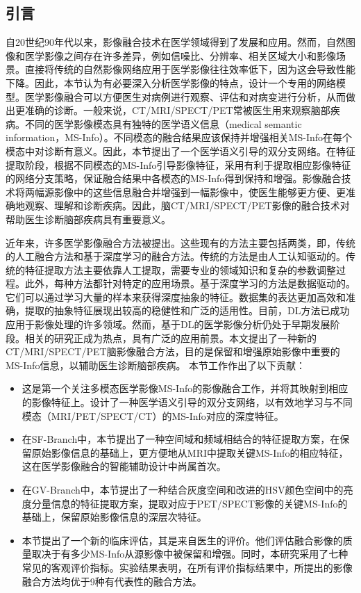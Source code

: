 \subsection{引言}
自20世纪90年代以来，影像融合技术在医学领域得到了发展和应用。然而，自然图像和医学影像之间存在许多差异，例如信噪比、分辨率、相关区域大小和影像场景\cite{wei2022beyond,shen2021Interpretable,guo2018single,xia2019global}。直接将传统的自然影像网络应用于医学影像往往效率低下，因为这会导致性能下降。因此，本节认为有必要深入分析医学影像的特点，设计一个专用的网络模型。医学影像融合可以方便医生对病例进行观察、评估和对病变进行分析，从而做出更准确的诊断。一般来说，CT/MRI/SPECT/PET常被医生用来观察脑部疾病。不同的医学影像模态具有独特的医学语义信息（medical semantic information，MS-Info）。不同模态的融合结果应该保持并增强相关MS-Info在每个模态中对诊断有意义。因此，本节提出了一个医学语义引导的双分支网络。在特征提取阶段，根据不同模态的MS-Info引导影像特征，采用有利于提取相应影像特征的网络分支策略，保证融合结果中各模态的MS-Info得到保持和增强。影像融合技术将两幅源影像中的这些信息融合并增强到一幅影像中，使医生能够更方便、更准确地观察、理解和诊断疾病。因此，脑CT/MRI/SPECT/PET影像的融合技术对帮助医生诊断脑部疾病具有重要意义。

近年来，许多医学影像融合方法被提出。这些现有的方法主要包括两类，即，传统的人工融合方法\cite{2017Boundary,2018Multi,2018Infrared,2020An,diwakar2021multi,2020Latent}和基于深度学习的融合方法\cite{2018DenseFuse,2018Deep,2018Unsupervised,kumar2019structural,2019FusionGAN,2020IFCNN,2020NestFuse,2020FusionDN,zhao2021learning}。传统的方法是由人工认知驱动的。传统的特征提取方法主要依靠人工提取，需要专业的领域知识和复杂的参数调整过程。此外，每种方法都针对特定的应用场景。基于深度学习的方法是数据驱动的。它们可以通过学习大量的样本来获得深度抽象的特征。数据集的表达更加高效和准确，提取的抽象特征展现出较高的稳健性和广泛的适用性。目前，DL方法已成功应用于影像处理的许多领域。然而，基于DL的医学影像分析仍处于早期发展阶段。相关的研究正成为热点，具有广泛的应用前景。本文提出了一种新的CT/MRI/SPECT/PET脑影像融合方法，目的是保留和增强原始影像中重要的MS-Info信息，以辅助医生诊断脑部疾病。
本节工作作出了以下贡献：

\begin{itemize}
    \item 这是第一个关注多模态医学影像MS-Info的影像融合工作，并将其映射到相应的影像特征上。设计了一种医学语义引导的双分支网络，以有效地学习与不同模态（MRI/PET/SPECT/CT）的MS-Info对应的深度特征。
    \item 在SF-Branch中，本节提出了一种空间域和频域相结合的特征提取方案，在保留原始影像信息的基础上，更方便地从MRI中提取关键MS-Info的相应特征，这在医学影像融合的智能辅助设计中尚属首次。
    \item 在GV-Branch中，本节提出了一种结合灰度空间和改进的HSV颜色空间中的亮度分量信息的特征提取方案，提取对应于PET/SPECT影像的关键MS-Info的基础上，保留原始影像信息的深层次特征。
    \item 本节提出了一个新的临床评估，其是来自医生的评价。他们评估融合影像的质量取决于有多少MS-Info从源影像中被保留和增强。同时，本研究采用了七种常见的客观评价指标。实验结果表明，在所有评价指标结果中，所提出的影像融合方法均优于9种有代表性的融合方法。
\end{itemize}


